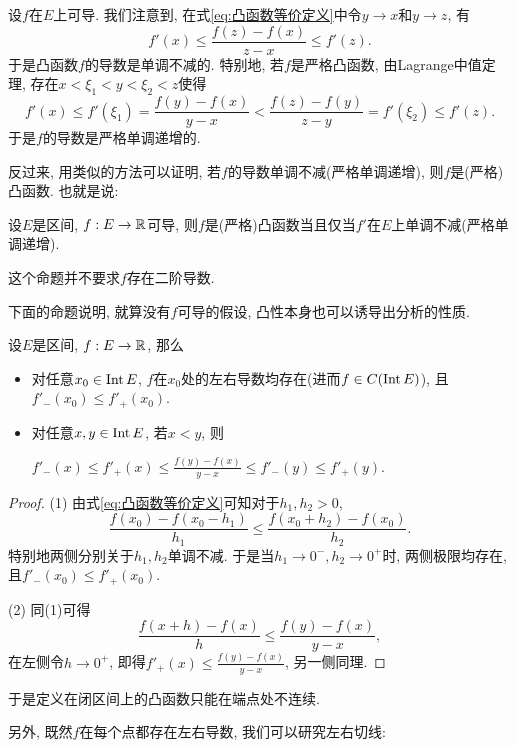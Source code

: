 设$f$在$E$上可导. 我们注意到, 在式\ref{eq:凸函数等价定义}中令$y \to x$和$y \to z$, 有$$f'(x) \leq \frac{f(z)-f(x)}{z-x} \leq f'(z). $$
于是凸函数$f$的导数是单调不减的. 特别地, 若$f$是严格凸函数, 由Lagrange中值定理, 存在$x<\xi _1 < y < \xi _2 < z$使得$$f'(x) \leq f'(\xi _1) = \frac{f(y)-f(x)}{y-x} < \frac{f(z)-f(y)}{z-y} = f'(\xi _2) \leq f'(z).$$
于是$f$的导数是严格单调递增的. 

反过来, 用类似的方法可以证明, 若$f$的导数单调不减(严格单调递增), 则$f$是(严格)凸函数. 也就是说: 

\begin{proposition}{}
	设$E$是区间, $f:E \to \mathbb{R}$可导, 则$f$是(严格)凸函数当且仅当$f'$在$E$上单调不减(严格单调递增). 
\end{proposition}
\begin{remark}
	这个命题并不要求$f$存在二阶导数. 
\end{remark}

下面的命题说明, 就算没有$f$可导的假设, 凸性本身也可以诱导出分析的性质. 

\begin{proposition}{}
	设$E$是区间, $f:E \to \mathbb{R}$, 那么
	\begin{itemize}
		\item 对任意$x_0 \in \operatorname{Int} E$, $f$在$x_0$处的左右导数均存在(进而$f\in C(\operatorname{Int} E)$), 且$f'_-(x_0) \leq f'_+(x_0)$.
		\item 对任意$x,y \in \operatorname{Int} E$, 若$x<y$, 则
		\begin{center}
			$\displaystyle f'_-(x) \leq f'_+(x) \leq  \frac{f(y)-f(x)}{y-x} \leq f'_-(y) \leq f'_+(y).$
		\end{center}
	\end{itemize}
\end{proposition}
\begin{proof}
	(1) 由式\ref{eq:凸函数等价定义}可知对于$h_1,h_2>0$, $$\frac{f(x_0)-f(x_0-h_1)}{h_1} \leq \frac{f(x_0+h_2)-f(x_0)}{h_2}.$$
	特别地两侧分别关于$h_1,h_2$单调不减. 于是当$h_1 \to 0^-,h_2 \to 0^+$时, 两侧极限均存在, 且$f'_-(x_0) \leq f'_+(x_0)$. 
	
	(2) 同(1)可得$$\frac{f(x+h)-f(x)}{h} \leq \frac{f(y)-f(x)}{y-x}, $$
	在左侧令$h \to 0^+$, 即得$f'_+(x) \leq \frac{f(y)-f(x)}{y-x}$, 另一侧同理. 
\end{proof}

于是定义在闭区间上的凸函数只能在端点处不连续. 

另外, 既然$f$在每个点都存在左右导数, 我们可以研究左右切线: 

